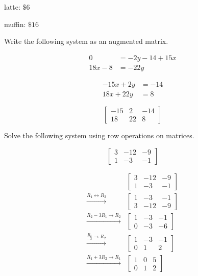\documentclass[addpoints]{exam}
\begin{document}
\begin{questions}
\begin{solution}
latte: \(\boxed{ \text{\$} 6 }\)

muffin: \(\boxed{ \text{\$} 16 }\)
\end{solution}
\newpage


\question[4]  Write the following system as an augmented matrix.

\[\begin{aligned} 0 &= -2y - 14 + 15x \\ 18x - 8 &= -22y \end{aligned}\]
\begin{solution}
\[\begin{aligned} -15x + 2y &= -14 \\ 18x + 22y &= 8 \end{aligned}\]

\[\boxed{ \left[\begin{array}{cc|c} -15 & 2 & -14 \\ 18 & 22 & 8 \end{array}\right] }\]
\end{solution}
\renewcommand{\arraystretch}{1}


\question[6]  Solve the following system using row operations on matrices.

\[\left[\begin{array}{cc|c} 3 & -12 & -9 \\ 1 & -3 & -1 \end{array}\right]\]
\answerline
\begin{solution}
\[\begin{aligned} & \left[\begin{array}{cc|c} 3 & -12 & -9 \\ 1 & -3 & -1 \end{array}\right] \\ \xrightarrow{R_1 \leftrightarrow R_2} & \left[\begin{array}{cc|c} 1 & -3 & -1 \\ 3 & -12 & -9 \end{array}\right] \\ \xrightarrow{R_2 - 3R_1 \to R_2} & \left[\begin{array}{cc|c} 1 & -3 & -1 \\ 0 & -3 & -6 \end{array}\right] \\ \xrightarrow{\frac{R_2}{-3} \to R_2} & \left[\begin{array}{cc|c} 1 & -3 & -1 \\ 0 & 1 & 2 \end{array}\right] \\ \xrightarrow{R_1 + 3R_2 \to R_1} & \left[\begin{array}{cc|c} 1 & 0 & 5 \\ 0 & 1 & 2 \end{array}\right] \end{aligned}\]


\end{solution}
\end{questions}
\end{document}
